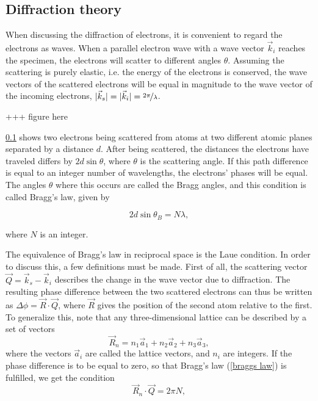 	\subsection{Diffraction theory}
When discussing the diffraction of electrons, it is convenient to regard the electrons as waves. When a parallel electron wave with a wave vector $\vec{k}_i$ reaches the specimen, the electrons will scatter to different angles $\theta$. Assuming the scattering is purely elastic, i.e. the energy of the electrons is conserved, the wave vectors of the scattered electrons will be equal in magnitude to the wave vector of the incoming electrons, $\vert \vec{k}_s \vert = \vert \vec{k}_i \vert = \nicefrac{2\pi}{\lambda}$.

+++ figure here

\cref{} shows two electrons being scattered from atoms at two different atomic planes separated by a distance $d$. After being scattered, the distances the electrons have traveled differs by $2d \sin \theta$, where $\theta$ is the scattering angle. If this path difference is equal to an integer number of wavelengths, the electrons' phases will be equal. The angles $\theta$ where this occurs are called the Bragg angles, and this condition is called Bragg's law, given by

\begin{equation}
\label{braggs law}
2 d \sin \theta_B = N\lambda,
\end{equation}

where $N$ is an integer.

The equivalence of Bragg's law in reciprocal space is the Laue condition. In order to discuss this, a few definitions must be made. First of all, the scattering vector $\vec{Q}=\vec{k}_s-\vec{k}_i$ describes the change in the wave vector due to diffraction. The resulting phase difference between the two scattered electrons can thus be written as $\Delta \phi = \vec{R} \cdot \vec{Q}$, where $\vec{R}$ gives the position of the second atom relative to the first. To generalize this, note that any three-dimensional lattice can be described by a set of vectors
\begin{equation}
\label{eq:real-lattice}
\vec{R}_n=n_1 \vec{a}_1 + n_2 \vec{a}_2 + n_3 \vec{a}_3,
\end{equation}
where the vectors $\vec{a}_i$ are called the lattice vectors, and $n_i$ are integers. If the phase difference is to be equal to zero, so that Bragg's law (\cref{braggs law}) is fulfilled, we get the condition
\begin{equation}
\label{eq:laue-cond-1}
\vec{R}_n \cdot \vec{Q} = 2 \pi N,
\end{equation}

